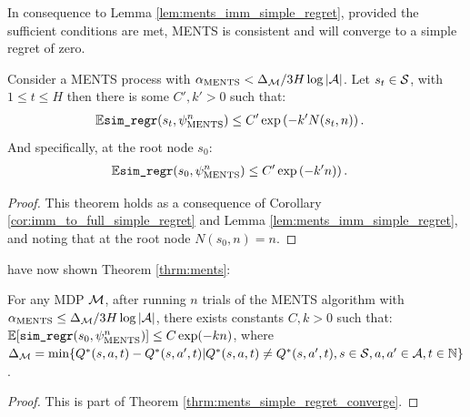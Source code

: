 








    
    In consequence to Lemma \ref{lem:ments_imm_simple_regret}, provided the sufficient conditions are met, MENTS is consistent and will converge to a simple regret of zero.
    \begin{theorem} \label{thrm:ments_simple_regret_converge}
        Consider a MENTS process with ${\alpha_{{\textnormal{MENTS}}}}<\Delta_{\mathcal{M}}/3H\log |\mathcal{A}|$.  Let $s_t\in\mathcal{S}$, with $1\leq t \leq H$  then there is some $C',k'>0$ such that:
        \begin{align}
            \mathbb{E} {\textnormal{\texttt{sim\_regr}}}(s_{t},\psi^{n}_{{\textnormal{MENTS}}}) &\leq C'\exp\left( -k' N(s_{t},n) \right).
        \end{align}
        And specifically, at the root node $s_0$:
        \begin{align}
            \mathbb{E} {\textnormal{\texttt{sim\_regr}}}(s_{0},\psi^{n}_{{\textnormal{MENTS}}}) &\leq C'\exp\left( -k'n) \right).
        \end{align}
    \end{theorem}
    \begin{proof}
        This theorem holds as a consequence of Corollary \ref{cor:imm_to_full_simple_regret} and Lemma \ref{lem:ments_imm_simple_regret}, and noting that at the root node $N(s_0,n)=n$.
    \end{proof}









     have now shown Theorem \ref{thrm:ments}:
    \begin{customthm}{3.2} 
        For any MDP $\mathcal{M}$, after running $n$ trials of the MENTS algorithm with ${\alpha_{{\textnormal{MENTS}}}} \leq \Delta_{\mathcal{M}}/3H\log|\mathcal{A}|$,  there exists constants $C,k>0$ such that: $\mathbb{E}[{\textnormal{\texttt{sim\_regr}}}(s_0,\psi^n_{\textnormal{MENTS}})] \leq C\exp(-kn)$, where $\Delta_{\mathcal{M}}=\min \{Q^*(s,a,t)-Q^*(s,a',t)\vert Q^*(s,a,t) \neq Q^*(s,a',t),s\in\mathcal{S}, a,a'\in\mathcal{A},t\in\mathbb{N}\}$.
    \end{customthm}
    \begin{proof}
        This is part of Theorem \ref{thrm:ments_simple_regret_converge}.
    \end{proof}











